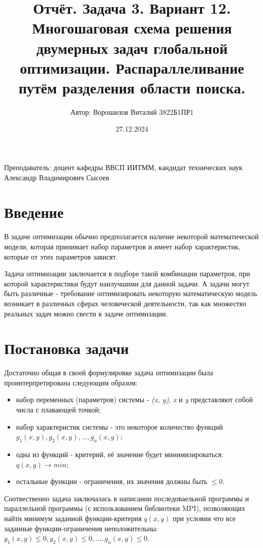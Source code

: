 \documentclass[12pt]{article}
\title{Отчёт. Задача 3. Вариант 12. Многошаговая схема решения двумерных задач глобальной оптимизации. Распараллеливание путём разделения области поиска.}
\author{Автор: Ворошилов Виталий 3822Б1ПР1}
\date{27.12.2024}
\begin{document}
\maketitle
Преподаватель: доцент кафедры ВВСП ИИТММ, кандидат технических наук Александр Владимирович Сысоев
\newpage

\tableofcontents
\newpage

\section{Введение}

В задаче оптимизации обычно предполагается наличие некоторой математической модели, которая принимает набор параметров и имеет набор характеристик, которые от этих параметров зависят.

Задача оптимизации заключается в подборе такой комбинации параметров, при которой характеристики будут наилучшими для данной задачи. А задачи могут быть различные - требование оптимизировать некоторую математическую модель возникает в различных сферах человеческой деятельности, так как множество реальных задач можно свести к задаче оптимизации.
       
\section{Постановка задачи}

Достаточно общая в своей формулировке задача оптимизации была проинтерпретирована следующим образом:
\begin{itemize}
    \item набор переменных (параметров) системы - \textit{(x, y)}, \textit{x} и \textit{y} представляют собой числа с плавающей точкой;
    \item набор характеристик системы - это некоторое количество функций \textit{$g_1(x, y), g_2(x, y), ..., g_n(x, y)$};
    \item одна из функций - критерий, её значение будет минимизироваться: \textit{$q(x, y) \rightarrow min$};
    \item остальные функции - ограничения, их значения должны быть \textit{$\leq 0$}.
\end{itemize}

Соотвественно задача заключалась в написании последоваельной программы и параллельной программы (с использованием библиотеки MPI), позволяющих найти минимум заданной функции-критерия $q(x, y)$ при условии что все заданные функции-ограничения неположительны: \textit{$g_1(x, y) \leq 0, g_2(x, y) \leq 0, ..., g_n(x, y) \leq 0$}.
\end{document}
